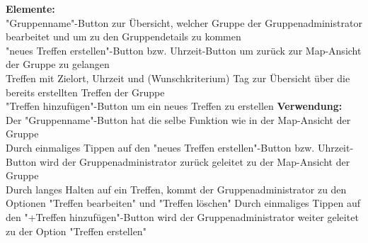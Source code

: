 \textbf{Elemente:}\\
"Gruppenname"-Button zur Übersicht, welcher Gruppe der Gruppenadministrator bearbeitet und um zu den Gruppendetails zu kommen\\
"neues Treffen erstellen"-Button bzw. Uhrzeit-Button um zurück zur Map-Ansicht der Gruppe zu gelangen\\
Treffen mit Zielort, Uhrzeit und (Wunschkriterium) Tag zur Übersicht über die bereits erstellten Treffen der Gruppe\\
"Treffen hinzufügen"-Button um ein neues Treffen zu erstellen
\textbf{Verwendung:}\\
Der "Gruppenname"-Button  hat die selbe Funktion wie in der Map-Ansicht der Gruppe\\
Durch einmaliges Tippen auf den "neues Treffen erstellen"-Button bzw. Uhrzeit-Button wird der Gruppenadministrator zurück geleitet zu der Map-Ansicht der Gruppe\\
Durch langes Halten auf ein Treffen, kommt der Gruppenadministrator zu den Optionen "Treffen bearbeiten" und "Treffen löschen"
Durch einmaliges Tippen auf den "+Treffen hinzufügen"-Button wird der Gruppenadministrator weiter geleitet zu der Option "Treffen erstellen"\\ \\

